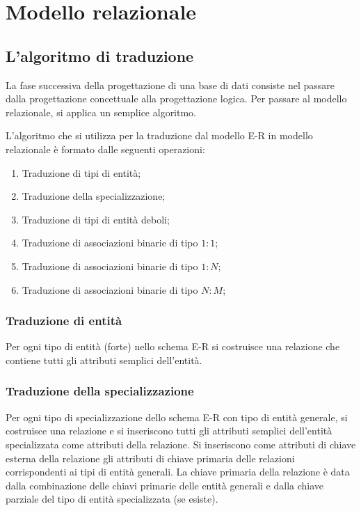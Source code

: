 
\chapter{Modello relazionale}
\label{cap:modello-relazionale}

\section{L'algoritmo di traduzione}
La fase successiva della progettazione di una base di dati consiste nel passare dalla progettazione concettuale alla progettazione logica. Per passare al modello relazionale, si applica un semplice algoritmo.

L'algoritmo che si utilizza per la traduzione dal modello E-R in modello relazionale è formato dalle seguenti operazioni:

\begin{enumerate}
	
	\item
	Traduzione di tipi di entità;
	
	\item
	Traduzione della specializzazione;
	
	\item
	Traduzione di tipi di entità deboli;
	
	\item
	Traduzione di associazioni binarie di tipo $1:1$;
	
	\item
	Traduzione di associazioni binarie di tipo $1:N$;
	
	\item
	Traduzione di associazioni binarie di tipo $N:M$;

\end{enumerate}

\subsection{Traduzione di entità}
	Per ogni tipo di entità (forte) nello schema E-R si costruisce una relazione che contiene tutti gli attributi semplici dell'entità.

\subsection{Traduzione della specializzazione}
	Per ogni tipo di specializzazione dello schema E-R con tipo di entità generale, si costruisce una relazione e si inseriscono tutti gli attributi semplici dell'entità specializzata come attributi della relazione. Si inseriscono come attributi di chiave esterna della relazione gli attributi di chiave primaria delle relazioni corrispondenti ai tipi di entità generali. La chiave primaria della relazione è data dalla combinazione delle chiavi primarie delle entità generali e dalla chiave parziale del tipo di entità specializzata (se esiste).

